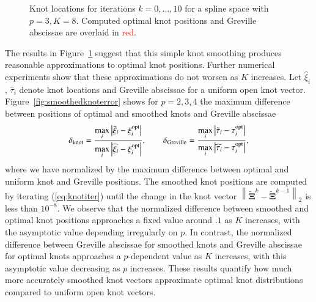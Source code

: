 \documentclass[preprint,10pt]{elsarticle}
\newcommand{\nor}[1]{\left\| #1 \right\|}
\newcommand{\LRb}[1]{\left| #1 \right|}
\begin{document}
\begin{figure}
\centering
{}
\hspace{1em}
\caption{Knot locations for iterations $k = 0, \ldots, 10$ for a spline space with $p = 3, K = 8$.  Computed optimal knot positions and Greville abscissae are overlaid in \textcolor{red}{red}.}
\label{fig:smoothedknots}
\end{figure}

The results in Figure~\ref{fig:smoothedknots} suggest that this simple knot smoothing produces reasonable approximations to optimal knot positions.  Further numerical experiments show that these approximations do not worsen as $K$ increases.  Let $\widehat{\xi}_i$, $\widehat{\tau}_i$ denote knot locations and Greville abscissae for a uniform open knot vector.  Figure~\ref{fig:smoothedknoterror} shows for $p = 2, 3, 4$ the maximum difference between positions of optimal and smoothed knots and Greville abscissae
\[
\delta_{\rm knot} = \frac{\underset{i}{\max} \LRb{\tilde{\xi}_i - \xi^{\rm opt}_i}}{\underset{i}{\max} \LRb{\widehat{\xi}_i - \xi^{\rm opt}_i}}, \qquad \delta_{\rm Greville} = \frac{\underset{i}{\max} \LRb{\tilde{\tau}_i - \tau^{\rm opt}_i}}{\underset{i}{\max} \LRb{\widehat{\tau}_i - \tau^{\rm opt}_i}}, 
\]
where we have normalized by the maximum difference between optimal and uniform knot and Greville positions.  The smoothed knot positions are computed by iterating (\ref{eq:knotiter}) until the change in the knot vector $\nor{\tilde{\bm{\Xi}}^{k} - \tilde{\bm{\Xi}}^{k-1}}_2$ is less than $10^{-8}$.  We observe that the normalized difference between smoothed and optimal knot positions approaches a fixed value around $.1$ as $K$ increases, with the asymptotic value depending irregularly on $p$.  In contrast, the normalized difference between Greville abscissae for smoothed knots and Greville abscissae for optimal knots approaches a $p$-dependent value as $K$ increases, with this asymptotic value decreasing as $p$ increases.  These results quantify how much more accurately smoothed knot vectors approximate optimal knot distributions compared to uniform open knot vectors.  
\end{document}
